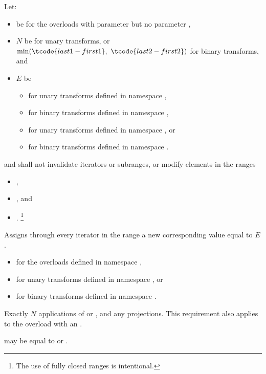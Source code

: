 \begin{itemdescr}
\pnum
Let:
\begin{itemize}
\setlength{\emergencystretch}{1em}
\item
   be 
  for the overloads with parameter 
  but no parameter ,
\item
  $N$ be  for unary transforms, or
  $\min(\tcode{last1 - first1}, \ \tcode{last2 - first2})$ for binary transforms, and
\item
  $E$ be
  \begin{itemize}
  \item
    for unary transforms defined in namespace ,
  \item
    for binary transforms defined in namespace ,
  \item
    for unary transforms defined in namespace , or
  \item
    for binary transforms defined in namespace .
  \end{itemize}
\end{itemize}

\pnum
\requires
{} and  shall not invalidate iterators or subranges, or
modify elements in the ranges
\begin{itemize}
\item {},
\item {}, and
\item {}.%
\footnote{The use of fully closed ranges is intentional.}
\end{itemize}

\pnum
\effects
Assigns through every iterator 
in the range 
a new corresponding value equal to $E$.

\pnum
\returns
\begin{itemize}
\item
  for the overloads defined in namespace ,
\item
  for unary transforms defined in namespace , or
\item {}
  for binary transforms defined in namespace .
\end{itemize}

\pnum
\complexity
Exactly $N$ applications of  or , and
any projections.
This requirement also applies to the overload with an .

\pnum
\remarks
{} may be equal to  or .
\end{itemdescr}

